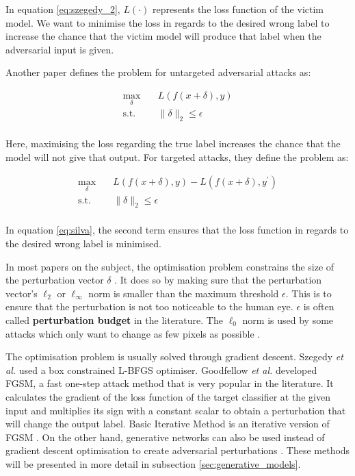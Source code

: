 In equation \ref{eq:szegedy_2}, $L(\cdot)$ represents the loss function of the victim model. We want to minimise the loss in regards to the desired wrong label to increase the chance that the victim model will produce that label when the adversarial input is given.

Another paper \cite{silva_survey} defines the problem for untargeted adversarial attacks as:

\begin{equation}
\begin{aligned}
\max_{\delta} \quad & L(f(x + \delta), y)\\
\textrm{s.t.} \quad& \|\delta\|_2\leq\epsilon   \\
\end{aligned}
\end{equation}

Here, maximising the loss regarding the true label increases the chance that the model will not give that output. For targeted attacks, they define the problem as:

\begin{equation}
\label{eq:silva}
\begin{aligned}
\max_{\delta} \quad & L(f(x + \delta), y) - L(f(x + \delta), y^\prime)\\
\textrm{s.t.} \quad& \|\delta\|_2\leq\epsilon   \\
\end{aligned}
\end{equation}

In equation \ref{eq:silva}, the second term ensures that the loss function in regards to the desired wrong label is minimised.

In most papers on the subject, the optimisation problem constrains the size of the perturbation vector $\delta$ \cite{akhtar, silva_survey, tnnls_survey}. It does so by making sure that the perturbation vector's $\ell_2$ or $\ell_\infty$ norm is smaller than the maximum threshold $\epsilon$. This is to ensure that the perturbation is not too noticeable to the human eye. $\epsilon$ is often called \textbf{perturbation budget} in the literature. The $\ell_0$ norm is used by some attacks which only want to change as few pixels as possible \cite{akhtar} . 

The optimisation problem is usually solved through gradient descent. Szegedy \textit{et al.} \cite{szegedy2014intriguing} used a box constrained L-BFGS optimiser. Goodfellow \textit{et al.} \cite{fgsm} developed FGSM, a fast one-step attack method that is very popular in the literature. It calculates the gradient of the loss function of the target classifier at the given input and multiplies its sign with a constant scalar to obtain a perturbation that will change the output label.  Basic Iterative Method is an iterative version of FGSM \cite{kurakin2016adversarial}. On the other hand, generative networks can also be used instead of gradient descent optimisation to create adversarial perturbations \cite{upset_angri, zheng_black_box_GAN, advGAN}. These methods will be presented in more detail in subsection \ref{sec:generative_models}. 


